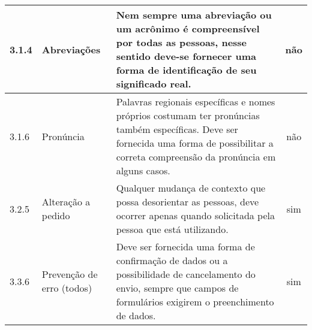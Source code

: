 \begin{appendices}
{\begin{minipage}{\linewidth}
{\begin{tabular}{|l|l|p{400px}|c|}
    3.1.4 &
      Abreviações & Nem sempre uma abreviação ou um acrônimo é compreensível por todas as pessoas, nesse sentido deve-se fornecer uma forma de identificação de seu significado real. & não \\ \hline
    3.1.6 &
      Pronúncia & Palavras regionais específicas e nomes próprios costumam ter pronúncias também específicas. Deve ser fornecida uma forma de possibilitar a correta compreensão da pronúncia em alguns casos. & não\\ \hline
    3.2.5 &
      Alteração a pedido & Qualquer mudança de contexto que possa desorientar as pessoas, deve ocorrer apenas quando solicitada pela pessoa que está utilizando. & sim\\ \hline
    3.3.6 &
      Prevenção de erro (todos) & Deve ser fornecida uma forma de confirmação de dados ou a possibilidade de cancelamento do envio, sempre que campos de formulários exigirem o preenchimento de dados. & sim\\ \hline

\end{tabular}
}
\label{Diretrizes nível AAA}

\end{minipage}

}


\end{appendices}